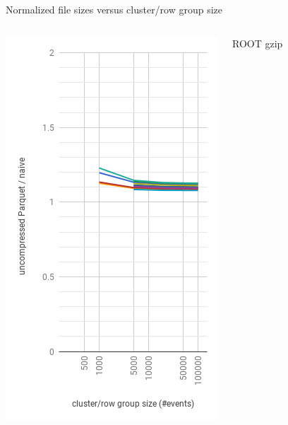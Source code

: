 \documentclass[aspectratio=169]{beamer}
\begin{document}
\begin{frame}{Normalized file sizes versus cluster/row group size}
\begin{columns}
\begin{center}
\includegraphics[width=\linewidth]{parquet-none.png}
\end{center}
\begin{center}
\normalsize ROOT gzip


\end{center}
\end{columns}
\end{frame}
\end{document}
